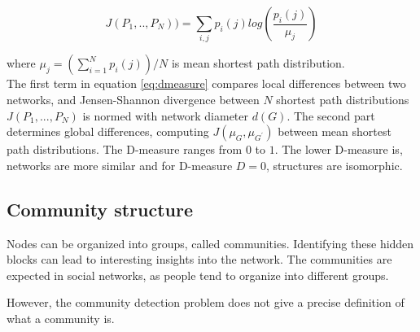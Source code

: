 \begin{equation}
J(P_1,.., P_N)) = \sum_{i,j}p_i(j)log(\frac{p_i(j)}{\mu_j})
\end{equation}

where  $\mu_j = (\sum_{i=1}^N p_i(j))/N$ is mean shortest path distribution. \\


The first term in equation \ref{eq:dmeasure} compares local differences between two networks, and Jensen-Shannon divergence between $N$ shortest path distributions $J(P_{1},...,P_{N})$ is normed with network diameter $d(G)$. The second part determines global differences, computing  ${J(\mu_{G},\mu_{G^{'}})}$ between mean shortest path distributions. 
The D-measure ranges from $0$ to $1$. The lower D-measure is, networks are more similar and for D-measure $D = 0$, structures are isomorphic.


\subsection{Community structure}

Nodes can be organized into groups, called communities. Identifying these hidden blocks can lead to interesting insights into the network. The communities are expected in social networks, as people tend to organize into different groups.  

However, the community detection problem does not give a precise definition of what a community is. 

